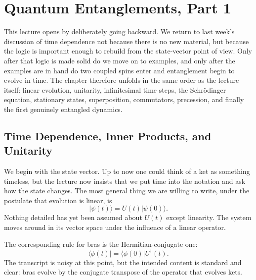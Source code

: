 \chapter{Quantum Entanglements, Part 1}

This lecture opens by deliberately going backward. We return to last week's discussion of time dependence not because there is no new material, but because the logic is important enough to rebuild from the state-vector point of view. Only after that logic is made solid do we move on to examples, and only after the examples are in hand do two coupled spins enter and entanglement begin to evolve in time. The chapter therefore unfolds in the same order as the lecture itself: linear evolution, unitarity, infinitesimal time steps, the Schrödinger equation, stationary states, superposition, commutators, precession, and finally the first genuinely entangled dynamics.

\section{Time Dependence, Inner Products, and Unitarity}

We begin with the state vector. Up to now one could think of a ket as something timeless, but the lecture now insists that we put time into the notation and ask how the state changes. The most general thing we are willing to write, under the postulate that evolution is linear, is
\begin{equation}
|\psi(t)\rangle = U(t)|\psi(0)\rangle.
\end{equation}
Nothing detailed has yet been assumed about \(U(t)\) except linearity. The system moves around in its vector space under the influence of a linear operator.

The corresponding rule for bras is the Hermitian-conjugate one:
\begin{equation}
\langle \phi(t)| = \langle \phi(0)|U^\dagger(t).
\end{equation}
The transcript is noisy at this point, but the intended content is standard and clear: bras evolve by the conjugate transpose of the operator that evolves kets.

